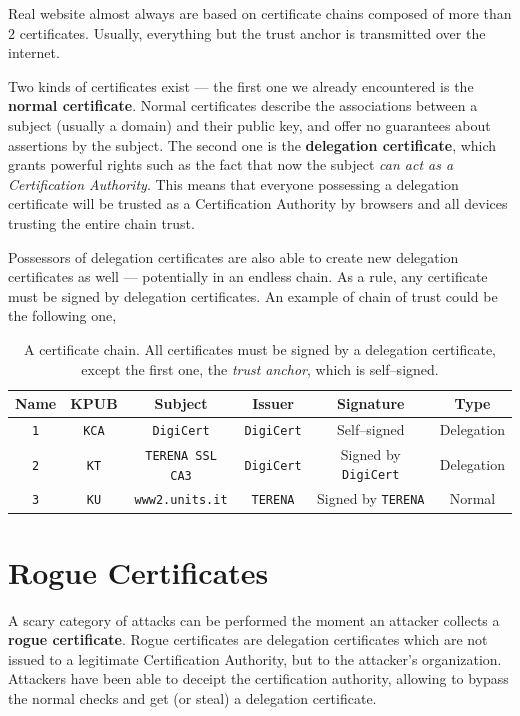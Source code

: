 \documentclass[10pt]{\classname}
\begin{document}
Real website almost always are based on certificate chains composed of more
than $2$ certificates. Usually, everything but the trust anchor is transmitted
over the internet.

Two kinds of certificates exist --- the first one we already encountered is the
\textbf{normal certificate}. Normal certificates describe the associations
between a subject (usually a domain) and their public key, and offer no
guarantees about assertions by the subject. The second one is the
\textbf{delegation certificate}, which grants powerful rights such as the fact
that now the subject \emph{can act as a Certification Authority}. This means
that everyone possessing a delegation certificate will be trusted as a
Certification Authority by browsers and all devices trusting the entire chain
trust.

Possessors of delegation certificates are also able to create new delegation
certificates as well --- potentially in an endless chain. As a rule, any
certificate must be signed by delegation certificates. An example of chain of
trust could be the following one,

\begin{table}[ht]
\centering
\begin{tabular}{cccccc}
    \textbf{Name} & \textbf{KPUB} & \textbf{Subject} & \textbf{Issuer} & \textbf{Signature} & \textbf{Type} \\
    \hline
    \texttt{1} & \texttt{KCA} & \texttt{DigiCert} & \texttt{DigiCert} & Self--signed  & Delegation \\
    \texttt{2} & \texttt{KT} & \texttt{TERENA SSL CA3} & \texttt{DigiCert} & Signed by \texttt{DigiCert} & Delegation \\
    \texttt{3} & \texttt{KU} & \texttt{www2.units.it} & \texttt{TERENA} & Signed by \texttt{TERENA} & Normal
\end{tabular}
\caption{A certificate chain. All certificates must be signed by a delegation
certificate, except the first one, the \emph{trust anchor}, which is
self--signed.}\label{tab:certificateChain1}
\end{table}
\bigskip

\section{Rogue Certificates}

A scary category of attacks can be performed the moment an attacker collects a
\textbf{rogue certificate}. Rogue certificates are delegation certificates
which are not issued to a legitimate Certification Authority, but to the
attacker's organization. Attackers have been able to deceipt the certification
authority, allowing to bypass the normal checks and get (or steal) a delegation
certificate.
\end{document}
